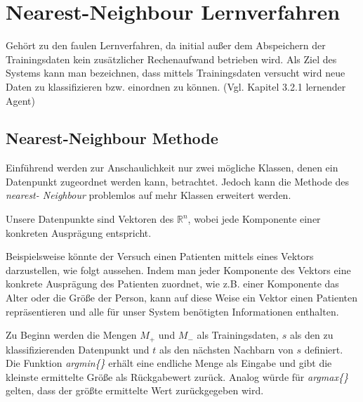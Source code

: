 \documentclass[fontsize=11pt]{scrartcl}
\begin{document}
                        
        \section{Nearest-Neighbour Lernverfahren}
            Gehört zu den faulen Lernverfahren, da initial außer dem Abspeichern der Trainingsdaten kein zusätzlicher Rechenaufwand betrieben wird. Als Ziel des Systems kann man bezeichnen, dass mittels Trainingsdaten versucht wird neue Daten zu klassifizieren bzw. einordnen zu können. (Vgl. Kapitel 3.2.1 lernender Agent)
                        
            \subsection{Nearest-Neighbour Methode}
                Einführend werden zur Anschaulichkeit nur zwei mögliche Klassen, denen ein Datenpunkt zugeordnet werden kann, betrachtet. Jedoch kann die Methode des \emph{nearest- Neighbour} problemlos auf mehr Klassen erweitert werden.\par
                Unsere Datenpunkte sind Vektoren des $\mathbb{R}^n$, wobei jede Komponente einer konkreten Ausprägung entspricht.\par
                Beispielsweise könnte der Versuch einen Patienten mittels eines Vektors darzustellen, wie folgt aussehen. Indem man jeder Komponente des Vektors eine konkrete Ausprägung des Patienten zuordnet, wie z.B. einer Komponente das Alter oder die Größe der Person, kann auf diese Weise ein Vektor einen Patienten repräsentieren und alle für unser System benötigten Informationen enthalten.\par
                Zu Beginn werden die Mengen $M_+$ und $M_-$ als Trainingsdaten, $s$ als den zu klassifizierenden Datenpunkt und $t$ als den nächsten Nachbarn von $s$ definiert. Die Funktion \emph{argmin\{\}} erhält eine endliche Menge als Eingabe und gibt die kleinste ermittelte Größe als Rückgabewert zurück. Analog würde für \emph{argmax\{\}} gelten, dass der größte ermittelte Wert zurückgegeben wird.\par
                        
\end{document}
